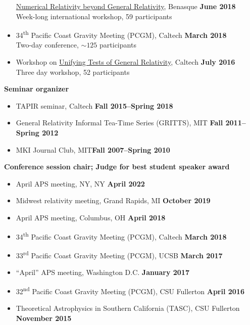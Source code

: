 \documentclass[margin,line]{res}
\begin{document}
\begin{resume}
\begin{itemize}
      \href{http://www.benasque.org/2018relativity/}{Numerical Relativity
        beyond General Relativity},
      Benasque \hfill {\bf June 2018} \\
      \hspace*{1em} Week-long international workshop, 59 participants
    \item[]
      34\textsuperscript{th} Pacific Coast Gravity Meeting (PCGM),
      Caltech
      \hfill {\bf March 2018}\\
      \hspace*{1em} Two-day conference, $\sim 125$ participants
    \item[] Workshop on \href{http://www.tapir.caltech.edu/~unifying-gr-tests/}{Unifying Tests of General Relativity},
      Caltech \hfill {\bf July 2016} \\
      \hspace*{1em} Three day workshop, 52 participants
  \end{itemize}
  {\bf Seminar organizer}
  \vspace*{.05in}
  \begin{itemize}
    \item[] TAPIR seminar, Caltech\hfill
      {\bf Fall 2015--Spring 2018}
    \item[] General Relativity Informal Tea-Time Series (GRITTS), MIT\hfill
      {\bf Fall 2011--Spring 2012}
    \item[] MKI Journal Club, MIT\hfill {\bf Fall 2007--Spring 2010}
  \end{itemize}
  {\bf Conference session chair; Judge for best student speaker award}
  \vspace*{.05in}
  \begin{itemize}
    \item[]
      April APS meeting, NY, NY
      \hfill {\bf April 2022}
    \item[]
      Midwest relativity meeting, Grand Rapids, MI
      \hfill {\bf October 2019}
    \item[]
      April APS meeting, Columbus, OH
      \hfill {\bf April 2018}
    \item[]
      34\textsuperscript{th} Pacific Coast Gravity Meeting (PCGM),
      Caltech
      \hfill {\bf March 2018}
    \item[]
      33\textsuperscript{rd} Pacific Coast Gravity Meeting (PCGM),
      UCSB
      \hfill {\bf March 2017}
    \item[]
      ``April'' APS meeting, Washington D.C.
      \hfill {\bf January 2017}
    \item[]
      32\textsuperscript{nd} Pacific Coast Gravity Meeting (PCGM),
      CSU Fullerton
      \hfill {\bf April 2016}
    \item[]
      Theoretical Astrophysics in Southern California (TASC),
      CSU Fullerton
      \hfill {\bf November 2015}
  \end{itemize}


\end{resume}
\end{document}
